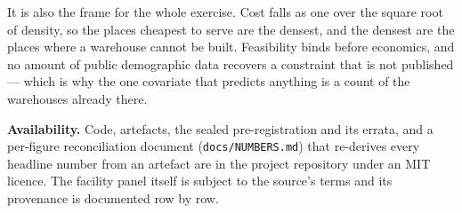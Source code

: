 \documentclass[conference]{IEEEtran}
\begin{document}
It is also the frame for the whole exercise. Cost falls as one over the square
root of density, so the places cheapest to serve are the densest, and the
densest are the places where a warehouse cannot be built. Feasibility binds
before economics, and no amount of public demographic data recovers a
constraint that is not published --- which is why the one covariate that
predicts anything is a count of the warehouses already there.

\vspace{1em}
\noindent\textbf{Availability.} Code, artefacts, the sealed pre-registration
and its errata, and a per-figure reconciliation document
(\texttt{docs/NUMBERS.md}) that re-derives every headline number from an
artefact are in the project repository under an MIT licence. The facility panel
itself is subject to the source's terms and its provenance is documented row by
row.
\end{document}

